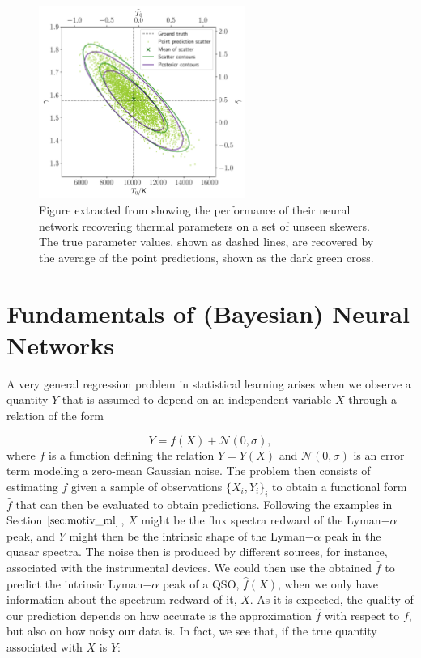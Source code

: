 \begin{figure}
    \centering
    \includegraphics[width=0.6\textwidth]{img//ML/scatter__and__posterior_contours_fiducial_tdr.pdf}
    \caption{Figure extracted from \cite{lynna} showing the performance of their neural network recovering thermal parameters on a set of unseen skewers. The true parameter values, shown as dashed lines, are recovered by the average of the point predictions, shown as the dark green cross.}
    \label{fig:ML LYNNA}
\end{figure}

\section{Fundamentals of (Bayesian) Neural Networks}

A very general regression problem in statistical learning \cite{James2021} arises when we observe a quantity $Y$ that is assumed to depend on an independent variable $X$ through a relation of the form

\begin{equation}
    Y = f(X)+\mathcal{N}(0,\sigma),
\end{equation}
where $f$ is a function defining the relation $Y=Y(X)$ and $\mathcal{N}(0,\sigma)$ is an error term modeling a zero-mean Gaussian noise. The problem then consists of estimating $f$ given a sample of observations $\{ X_i, Y_i\}_i$ to obtain a functional form $\hat{f}$ that can then be evaluated to obtain predictions. Following the examples in Section $\ref{sec:motiv_ml}$, $X$ might be the flux spectra redward of the Lyman$-\alpha$ peak, and $Y$ might then be the intrinsic shape of the Lyman$-\alpha$ peak in the quasar spectra. The noise then is produced by different sources, for instance, associated with the instrumental devices. We could then use the obtained $\hat{f}$ to predict the intrinsic Lyman$-\alpha$ peak of a QSO, $\hat{f}(X)$, when we only have information about the spectrum redward of it, $X$. As it is expected, the quality of our prediction depends on how accurate is the approximation $\hat{f}$ with respect to $f$, but also on how noisy our data is. In fact, we see that, if the true quantity associated with $X$ is $Y$:

